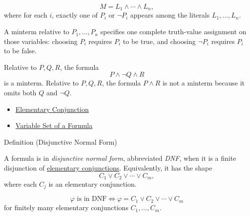 \begin{remark*}
\[
M=L_1\land\cdots\land L_n,
\]
where for each \(i\), exactly one of \(P_i\) or \(\neg P_i\) appears among the
literals \(L_1,\ldots,L_n\).
\end{remark*}

\begin{remark*}[Interpretation]
A minterm relative to \(P_1,\ldots,P_n\) specifies one complete truth-value
assignment on those variables: choosing \(P_i\) requires \(P_i\) to be true,
and choosing \(\neg P_i\) requires \(P_i\) to be false.
\end{remark*}

\begin{example*}[Examples]
Relative to \(P,Q,R\), the formula
\[
P\land\neg Q\land R
\]
is a minterm. Relative to \(P,Q,R\), the formula \(P\land R\) is not a
minterm because it omits both \(Q\) and \(\neg Q\).
\end{example*}

\begin{dependencies}
\begin{itemize}
  \item \hyperref[def:elementary-conjunction-propositional-logic]{Elementary Conjunction}
  \item \hyperref[def:formula-variable-set-propositional-logic]{Variable Set of a Formula}
\end{itemize}
\end{dependencies}

\begin{definitionbox}{Definition (Disjunctive Normal Form)}
\begin{definition}
\label{def:disjunctive-normal-form-propositional-logic}
A formula is in \emph{disjunctive normal form}, abbreviated \emph{DNF}, when it
is a finite disjunction of
\hyperref[def:elementary-conjunction-propositional-logic]{elementary conjunctions}.
Equivalently, it has the shape
\[
C_1\lor C_2\lor\cdots\lor C_m,
\]
where each \(C_j\) is an elementary conjunction.
\end{definition}
\end{definitionbox}

\begin{remark*}
\[
\varphi\text{ is in DNF}
\Longleftrightarrow
\varphi=C_1\lor C_2\lor\cdots\lor C_m
\]
for finitely many elementary conjunctions \(C_1,\ldots,C_m\).
\end{remark*}

